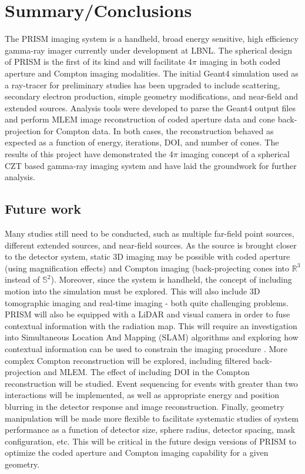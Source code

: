 \documentclass[10pt]{article}
\begin{document}
\section{Summary/Conclusions}

The PRISM imaging system is a handheld, broad energy sensitive, high efficiency gamma-ray imager currently under development at LBNL. The spherical design of PRISM is the first of its kind and will facilitate 4$\pi$ imaging in both coded aperture and Compton imaging modalities. The initial Geant4 simulation used as a ray-tracer for preliminary studies has been upgraded to include scattering, secondary electron production, simple geometry modifications, and near-field and extended sources. Analysis tools were developed to parse the Geant4 output files and perform MLEM image reconstruction of coded aperture data and cone back-projection for Compton data. In both cases, the reconstruction behaved as expected as a function of energy, iterations, DOI, and number of cones. The results of this project have demonstrated the 4$\pi$ imaging concept of a spherical CZT based gamma-ray imaging system and have laid the groundwork for further analysis.


\subsection{Future work}

Many studies still need to be conducted, such as multiple far-field point sources, different extended sources, and near-field sources. As the source is brought closer to the detector system, static 3D imaging may be possible with coded aperture (using magnification effects) and Compton imaging (back-projecting cones into $\mathbb{R}^3$ instead of $\mathbb{S}^2$). Moreover, since the system is handheld, the concept of including motion into the simulation must be explored. This will also include 3D tomographic imaging and real-time imaging - both quite challenging problems. PRISM will also be equipped with a LiDAR and visual camera in order to fuse contextual information with the radiation map. This will require an investigation into Simultaneous Location And Mapping (SLAM) algorithms and exploring how contextual information can be used to constrain the imaging procedure \cite{Barnowski2015}. More complex Compton reconstruction will be explored, including filtered back-projection and MLEM. The effect of including DOI in the Compton reconstruction will be studied. Event sequencing for events with greater than two interactions will be implemented, as well as appropriate energy and position blurring in the detector response and image reconstruction. Finally, geometry manipulation will be made more flexible to facilitate systematic studies of system performance as a function of detector size, sphere radius, detector spacing, mask configuration, etc. This will be critical in the future design versions of PRISM to optimize the coded aperture and Compton imaging capability for a given geometry. 
\end{document}

